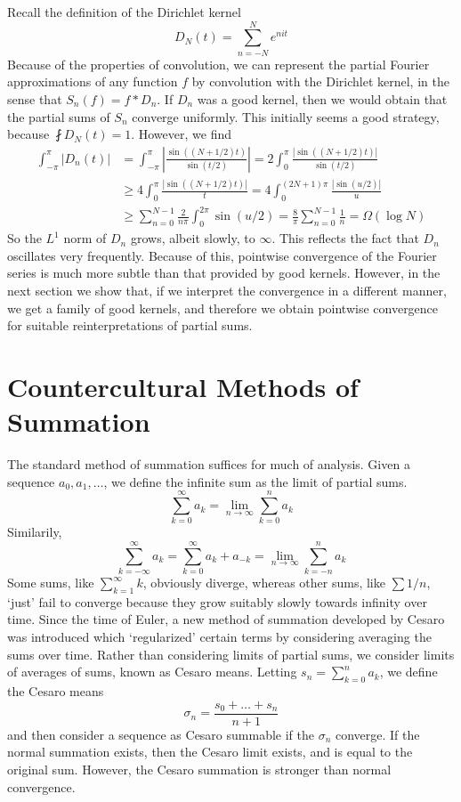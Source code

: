 Recall the definition of the Dirichlet kernel
%
\[ D_N(t) = \sum_{n = -N}^N e^{nit} \]
%
Because of the properties of convolution, we can represent the partial Fourier approximations of any function $f$ by convolution with the Dirichlet kernel, in the sense that $S_n(f) = f * D_n$. If $D_n$ was a good kernel, then we would obtain that the partial sums of $S_n$ converge uniformly. This initially seems a good strategy, because $\fint D_N(t) = 1$. However, we find
%
\begin{align*}
    \int_{-\pi}^\pi |D_n(t)| &= \int_{-\pi}^\pi \left| \frac{\sin((N + 1/2)t)}{\sin(t/2)} \right| = 2 \int_0^\pi \frac{|\sin((N+1/2) t)|}{\sin(t/2)}\\
    &\geq 4 \int_0^\pi \frac{|\sin((N+1/2) t)|}{t} = 4 \int_0^{(2N+1)\pi} \frac{|\sin(u/2)|}{u}\\
    &\geq \sum_{n = 0}^{N-1} \frac{2}{n \pi} \int_0^{2 \pi} \sin(u/2) = \frac{8}{\pi} \sum_{n = 0}^{N-1} \frac{1}{n} = \Omega(\log N)
\end{align*}
%
So the $L^1$ norm of $D_n$ grows, albeit slowly, to $\infty$. This reflects the fact that $D_n$ oscillates very frequently. Because of this, pointwise convergence of the Fourier series is much more subtle than that provided by good kernels. However, in the next section we show that, if we interpret the convergence in a different manner, we get a family of good kernels, and therefore we obtain pointwise convergence for suitable reinterpretations of partial sums.

\section{Countercultural Methods of Summation}

The standard method of summation suffices for much of analysis. Given a sequence $a_0, a_1, \dots$, we define the infinite sum as the limit of partial sums.
%
\[ \sum_{k = 0}^\infty a_k = \lim_{n \to \infty} \sum_{k = 0}^n a_k \]
%
Similarily,
%
\[ \sum_{k = -\infty}^\infty a_k = \sum_{k = 0}^\infty a_k + a_{-k} = \lim_{n \to \infty} \sum_{k = -n}^n a_k \]
%
Some sums, like $\sum_{k = 1}^\infty k$, obviously diverge, whereas other sums, like $\sum 1/n$, `just' fail to converge because they grow suitably slowly towards infinity over time. Since the time of Euler, a new method of summation developed by Cesaro was introduced which `regularized' certain terms by considering averaging the sums over time. Rather than considering limits of partial sums, we consider limits of averages of sums, known as Cesaro means. Letting $s_n = \sum_{k = 0}^n a_k$, we define the Cesaro means
%
\[ \sigma_n = \frac{s_0 + \dots + s_n}{n+1} \]
%
and then consider a sequence as Cesaro summable if the $\sigma_n$ converge. If the normal summation exists, then the Cesaro limit exists, and is equal to the original sum. However, the Cesaro summation is stronger than normal convergence.

